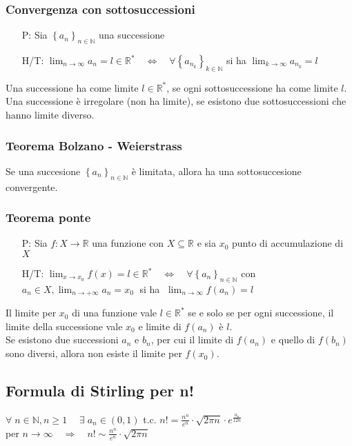 \documentclass[a4paper]{article}
\begin{document}
\subsubsection*{Convergenza con sottosuccessioni}
\begin{itemize}
	\item[P:] Sia \(\left\{ a_n \right\}_{n \in \mathbb{N}}\) una successione
	\item[H/T:] \(\displaystyle \lim_{n \to \infty} a_n = l \in \mathbb{R}^* \quad \Leftrightarrow \quad \forall \left\{ a_{n_k} \right\}_{k \in \mathbb{N}}\) si ha \(\displaystyle \lim_{k \to \infty} a_{n_k} = l\)
\end{itemize}
Una successione ha come limite \(l \in \mathbb{R}^*\), se ogni sottosuccessione ha come limite \(l\). \\
Una successione è irregolare (non ha limite), se esistono due sottosuccessioni che hanno limite diverso.

\subsubsection*{Teorema Bolzano - Weierstrass}
Se una succesione \(\left\{ a_n \right\}_{n \in \mathbb{N}}\) è limitata, allora ha una sottosuccesione convergente.

\subsubsection*{Teorema ponte}
\begin{itemize}
	\item[P:] Sia \(f: X \to \mathbb{R}\) una funzione con \(X \subseteq \mathbb{R}\) e sia \(x_0\) punto di accumulazione di \(X\)
	\item[H/T:] \(\displaystyle \lim_{x \to x_0} f(x) = l \in \mathbb{R}^* \quad \Leftrightarrow \quad \forall \left\{ a_n \right\}_{n \in \mathbb{N}}\) con \(\displaystyle a_n \in X, \lim_{n \to +\infty} a_n = x_0 \;\) si ha \(\; \displaystyle \lim_{n \to \infty} f(a_n) = l\)
\end{itemize}
Il limite per \(x_0\) di una funzione vale \(l \in \mathbb{R}^*\) se e solo se per ogni successione, il limite della successione vale \(x_0\) e limite di \(f(a_n)\) è \(l\). \\
Se esistono due successioni \(a_n\) e \(b_n\), per cui il limite di \(f(a_n)\) e quello di \(f(b_n)\) sono diversi, allora non esiste il limite per \(f(x_0)\).

\subsection{Formula di Stirling per n!}
\(\forall \; n \in \mathbb{N}, n \geq 1 \quad \; \exists \; a_n \in \left( 0, 1 \right)\) t.c. \(\displaystyle n! = \frac{n^n}{e^n} \cdot \sqrt{2 \pi n} \cdot e ^ {\frac{a_n}{12n}}\) \\
per \(\displaystyle n \to \infty \quad \Rightarrow \quad n! \sim \frac{n^n}{e^n} \cdot \sqrt{2 \pi n}\)
\end{document}
